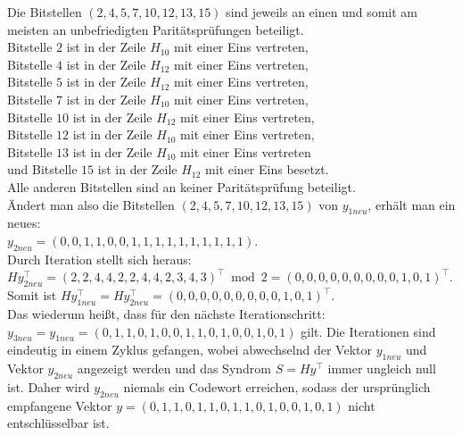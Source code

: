 \begin{Beispiel}
        
        Die Bitstellen $(2, 4, 5, 7, 10, 12, 13, 15)$ sind jeweils an einen und somit am meisten an unbefriedigten Paritätsprüfungen beteiligt.\\ 
        Bitstelle $2$ ist in der Zeile $H_{10}$ mit einer Eins vertreten,\\
        Bitstelle $4$ ist in der Zeile $H_{12}$ mit einer Eins vertreten,\\
        Bitstelle $5$ ist in der Zeile $H_{12}$ mit einer Eins vertreten,\\
        Bitstelle $7$ ist in der Zeile $H_{10}$ mit einer Eins vertreten,\\
        Bitstelle $10$ ist in der Zeile $H_{12}$ mit einer Eins vertreten,\\
        Bitstelle $12$ ist in der Zeile $H_{10}$ mit einer Eins vertreten,\\
        Bitstelle $13$ ist in der Zeile $H_{10}$ mit einer Eins vertreten\\      
        und Bitstelle $15$ ist in der Zeile $H_{12}$ mit einer Eins besetzt.\\
        Alle anderen Bitstellen sind an keiner Paritätsprüfung beteiligt.\\
        
        Ändert man also die Bitstellen $(2, 4, 5, 7, 10, 12, 13, 15)$  von $y_{1neu}$, erhält man ein neues:\\
        $y_{2neu} = (0,0,1,1,0,0,1,1,1,1,1,1,1,1,1,1).$\\
        
        Durch Iteration stellt sich heraus:\\
        $Hy_{2neu}^\intercal = (2,2,4,4,2,2,4,4,2,3,4,3)^\intercal \bmod 2 =(0,0,0,0,0,0,0,0,0,1,0,1)^\intercal.$\\
        
        Somit ist $Hy_{1neu}^\intercal = Hy_{2neu}^\intercal = (0,0,0,0,0,0,0,0,0,1,0,1)^\intercal.$\\
        Das wiederum hei\ss{}t, dass für den nächste Iterationschritt:\\
        $y_{3neu} = y_{1neu} = (0,1,1,0,1,0,0,1,1,0,1,0,0,1,0,1)$ gilt. Die Iterationen sind eindeutig in einem Zyklus gefangen, wobei abwechselnd 
        der Vektor $y_{1neu}$ und Vektor $y_{2neu}$ angezeigt werden und 
        das Syndrom $S= Hy^\intercal$ immer ungleich null ist.
        Daher wird $y_{2neu}$ niemals ein Codewort erreichen,
        sodass der ursprünglich empfangene Vektor $y = (0,1,1,0,1,1,0,1,1,0,1,0,0,1,0,1)$ nicht entschlüsselbar ist.\\
        \pagebreak
    \end{Beispiel}

